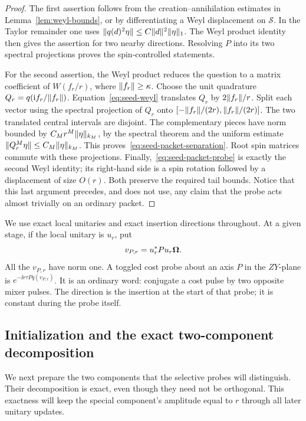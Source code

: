 \begin{proof}
The first assertion follows from the creation--annihilation estimates in
Lemma~\ref{lem:weyl-bounds}, or by differentiating a Weyl displacement on
\(\mathcal S\).  In the Taylor remainder one uses
\(\lVert q(d)^2\eta\rVert\leq C\lVert d\rVert^2\lVert \eta\rVert_1\).
The Weyl product identity then gives the assertion for two nearby
directions.  Resolving \(P\) into its two spectral projections proves the
spin-controlled statements.

For the second assertion, the Weyl product reduces the question to a
matrix coefficient of \(W(f_r/r)\), where \(\lVert f_r\rVert\geq\kappa\).
Choose the unit quadrature
\(Q_r=q(\mathrm i f_r/\lVert f_r\rVert)\).  Equation~\eqref{eq:seed-weyl}
translates \(Q_r\) by \(2\lVert f_r\rVert/r\).  Split each vector using the
spectral projection of \(Q_r\) onto
\([-\lVert f_r\rVert/(2r),\lVert f_r\rVert/(2r)]\).  The two translated central
intervals are disjoint.  The complementary pieces have norm bounded by
\(C_Mr^M\lVert \eta\rVert_{k_M}\), by the spectral theorem and the uniform
estimate \(\lVert Q_r^M\eta\rVert\leq C_M\lVert \eta\rVert_{k_M}\).
This proves~\eqref{eq:seed-packet-separation}.  Root spin matrices commute
with these projections.  Finally,~\eqref{eq:seed-packet-probe} is exactly
the second Weyl identity; its right-hand side is a spin rotation followed
by a displacement of size \(O(r)\).  Both preserve the required tail
bounds.  Notice that this last argument precedes, and does not use, any
claim that the probe acts almost trivially on an ordinary packet.
\end{proof}

We use exact local unitaries and exact insertion directions throughout.
At a given stage, if the local unitary is \(u_r\), put
\[
 v_{P,r}=u_r^*Pu_r\boldsymbol\Omega.
\]
All the \(v_{P,r}\) have norm one.  A toggled cost probe about an axis
\(P\) in the \(ZY\)-plane is
\(e^{-\ii r\tau Pq(v_{P,r})}\).  It is an ordinary word: conjugate a
cost pulse by two opposite mixer pulses.  The direction is the insertion
at the start of that probe; it is constant during the probe itself.

\subsection{Initialization and the exact two-component decomposition}

We next prepare the two components that the selective probes will distinguish.
Their decomposition is exact, even though they need not be orthogonal.
This exactness will keep the special component's amplitude equal to
\(r\) through all later unitary updates.

